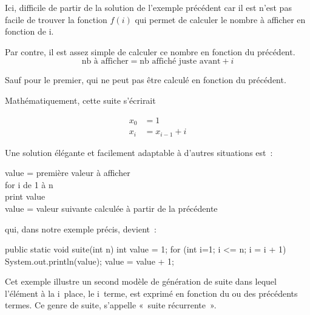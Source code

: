 		Ici, difficile de partir de la solution de l’exemple précédent car il
		est n’est pas facile de trouver la fonction $f(i)$ qui permet de
		calculer le nombre à afficher en fonction de i. 
		
		Par contre, il est assez simple de calculer ce nombre 
		en fonction du précédent.
		\[
			\mbox{nb à afficher} = \mbox{nb affiché juste avant} + i
		\]
		
		Sauf pour le premier, qui ne peut pas être calculé en fonction du
		précédent.

		Mathématiquement, cette suite s'écrirait

		\begin{align*}
			x_0 &= 1\\
			x_i &= x_{i-1} + i
		\end{align*}


		Une solution élégante et facilement adaptable à d’autres situations
		est~:

		\begin{langagenaturel}
			value = première valeur à afficher\\
			for i de 1 à n\\
			\tab print value\\
			\tab value = valeur suivante calculée à partir de la précédente
		\end{langagenaturel}
		
		
		qui, dans notre exemple précis, devient~:

		\begin{java}
public static void suite(int n){
	int value = 1;
	for (int i=1; i <= n; i = i + 1){
		System.out.println(value);
		value = value + 1;
	}
}
		\end{java}

		Cet exemple illustre un second modèle de génération de suite dans lequel
		l'élément à la i\ieme\ place, le i\ieme\ terme, est exprimé en fonction
		du ou des précédents termes. Ce genre de suite, s'appelle  «~suite
		récurrente~». 
                     
